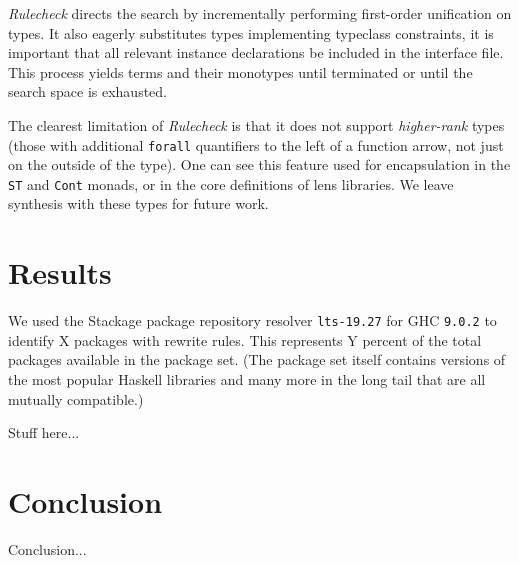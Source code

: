 \documentclass[format=sigconf, nonacm=true, review=true, screen=true]{acmart}
\newcommand{\Rulecheck}{\textit{Rulecheck}\xspace}
\begin{document}
\Rulecheck directs the search by incrementally performing first-order unification on types. It also eagerly substitutes types implementing typeclass constraints, it is important that all relevant instance declarations be included in the interface file. This process yields terms and their monotypes until terminated or until the search space is exhausted.

The clearest limitation of \Rulecheck is that it does not support \textit{higher-rank} types (those with additional \texttt{forall} quantifiers to the left of a function arrow, not just on the outside of the type). One can see this feature used for encapsulation in the \texttt{ST} and \texttt{Cont} monads, or in the core definitions of lens libraries. We leave synthesis with these types for future work.

\section{Results}

We used the Stackage package repository resolver \texttt{lts-19.27} for GHC \texttt{9.0.2} to identify X packages with rewrite rules. \cite{stackage} This represents Y percent of the total packages available in the package set. (The package set itself contains versions of the most popular Haskell libraries and many more in the long tail that are all mutually compatible.)

Stuff here...

\section{Conclusion}

Conclusion...



\end{document}
